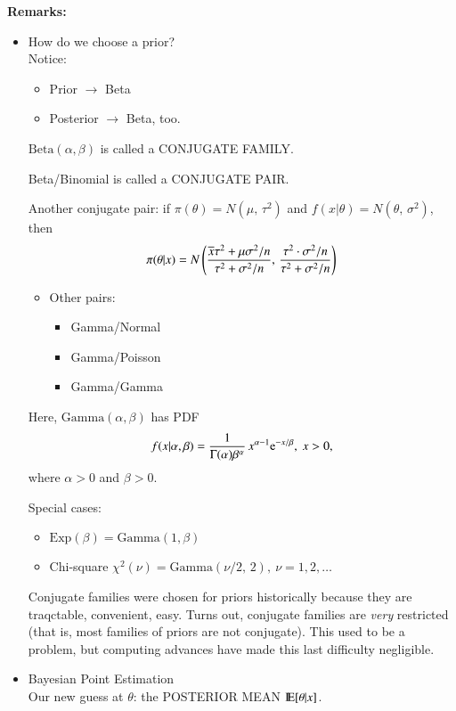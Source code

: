 \documentclass[captions=tableheading]{scrbook}
\begin{document}
\textbf{Remarks:}
\begin{itemize}

\item How do we choose a prior?\\
\label{sec-1_3_2_1}%
Notice:

\begin{itemize}
\item Prior $\to$ Beta
\item Posterior $\to$ Beta, too.
\end{itemize}

\(\mathrm{Beta}(\alpha,\beta)\) is called a CONJUGATE FAMILY.

Beta/Binomial is called a CONJUGATE PAIR.

Another conjugate pair: if \(\pi(\theta) = N(\mu,\,\tau^{2})\) and  \(f(x|\theta) = N(\theta,\,\sigma^{2})\), then
\[
\pi(\theta|x) = N\left(\frac{\overline{x}\tau^{2}+\mu\sigma^{2}/n}{\tau^{2}+\sigma^{2}/n},\,\frac{\tau^{2}\cdot\sigma^{2}/n}{\tau^{2}+\sigma^{2}/n}  \right)
\]


\begin{itemize}
\item Other pairs:
\begin{itemize}
\item Gamma/Normal
\item Gamma/Poisson
\item Gamma/Gamma
\end{itemize}
\end{itemize}

Here, \(\mathrm{Gamma}(\alpha,\beta)\) has PDF
\[
f(x|\alpha,\beta) = \frac{1}{\Gamma(\alpha)\beta^{\alpha}}\,x^{\alpha - 1} \me^{-x/\beta},\ x > 0,
\]
where $\alpha > 0$ and $\beta > 0$.

Special cases:

\begin{itemize}
\item \(\mathrm{Exp}(\beta) = \mathrm{Gamma}(1,\beta)\)
\item Chi-square \(\chi^{2}(\nu) = \mathrm{Gamma}(\nu/2,\,2),\ \nu =1,2,\ldots\)
\end{itemize}

Conjugate families were chosen for priors historically because they are traqctable, convenient, easy.  Turns out, conjugate families are \emph{very} restricted (that is, most families of priors are not conjugate).  This used to be a problem, but computing advances have made this last difficulty negligible.


\item Bayesian Point Estimation\\
\label{sec-1_3_2_2}%
Our new guess at $\theta$:  the POSTERIOR MEAN $\mathrm{I\hspace{-1.5pt}E} [\theta|x]$.


\end{itemize}
\end{document}
